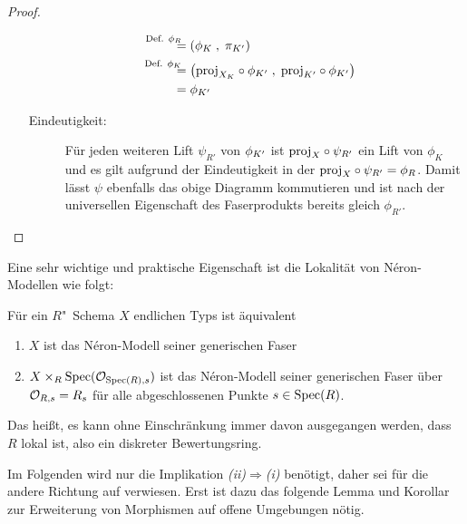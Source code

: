 \begin{Satz}
\begin{proof}
\begin{enumerate}[resume*,start=1]
\begin{description}
\begin{align*}
          &\overset{\mathllap{\text{Def. }\phi_R}}{=} \left(
            \phi_{\K}\;,\; \pi_{\K'}
            \right)\\
          &\overset{\mathllap{\text{Def. }\phi_\K}}{=} \left(
            \proj_{X_\K}\circ\phi_{\K'}\;,\;
            \proj_{\K'}\circ\phi_{\K'}
            \right)\\
          &= \phi_{\K'}
        \end{align*}
      \item[Eindeutigkeit:]
        Für jeden weiteren Lift $\psi_{R'}$ von $\phi_{K'}$ ist
        $\text{proj}_{X}\circ\psi_{R'}$ ein Lift von $\phi_{K}$ und es gilt
        aufgrund der Eindeutigkeit in der \NAbbEig
        ${\text{proj}_{X}\circ\psi_{R'}=\phi_{R}}$.
        Damit lässt $\psi$ ebenfalls das obige Diagramm kommutieren
        und ist nach der universellen Eigenschaft des Faserprodukts
        bereits gleich $\phi_{R'}$.
        \qedhere
      \end{description}
    \end{enumerate}
  \end{proof}
\end{Satz}

Eine sehr wichtige und praktische Eigenschaft ist die Lokalität von
Néron-Modellen wie folgt:
\begin{Satz}\label{thm:neronmodelllokal}
  Für ein $R$"~Schema $X$ endlichen Typs ist äquivalent
  \begin{enumerate}[label=(\roman*)]
  \item $X$ ist das Néron-Modell seiner generischen Faser
  \item $X\times_R\operatorname{Spec}(\mathcal{O}_{\operatorname{Spec}(R),s})$ ist das Néron-Modell
    seiner generischen Faser über $\mathcal{O}_{R,s}=R_s$ für alle
    abgeschlossenen Punkte $s\in\operatorname{Spec}(R)$.
  \end{enumerate}
  Das heißt, es kann ohne Einschränkung immer davon ausgegangen
  werden, dass $R$ lokal ist, also ein diskreter Bewertungsring.
\end{Satz}

Im Folgenden wird nur die Implikation
\emph{(ii)}$\Rightarrow$\emph{(i)} benötigt, daher sei für die
andere Richtung auf \cite[Proposition~1.2/4]{neron} verwiesen.
Erst ist dazu das folgende Lemma und Korollar zur Erweiterung von
Morphismen auf offene Umgebungen nötig.

